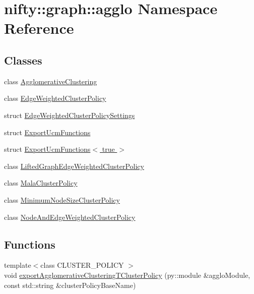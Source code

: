 \hypertarget{namespacenifty_1_1graph_1_1agglo}{}\section{nifty\+:\+:graph\+:\+:agglo Namespace Reference}
\label{namespacenifty_1_1graph_1_1agglo}
\subsection*{Classes}
\begin{DoxyCompactItemize}
\item 
class \hyperlink{classnifty_1_1graph_1_1agglo_1_1AgglomerativeClustering}{Agglomerative\+Clustering}
\item 
class \hyperlink{classnifty_1_1graph_1_1agglo_1_1EdgeWeightedClusterPolicy}{Edge\+Weighted\+Cluster\+Policy}
\item 
struct \hyperlink{structnifty_1_1graph_1_1agglo_1_1EdgeWeightedClusterPolicySettings}{Edge\+Weighted\+Cluster\+Policy\+Settings}
\item 
struct \hyperlink{structnifty_1_1graph_1_1agglo_1_1ExportUcmFunctions}{Export\+Ucm\+Functions}
\item 
struct \hyperlink{structnifty_1_1graph_1_1agglo_1_1ExportUcmFunctions_3_01true_01_4}{Export\+Ucm\+Functions$<$ true $>$}
\item 
class \hyperlink{classnifty_1_1graph_1_1agglo_1_1LiftedGraphEdgeWeightedClusterPolicy}{Lifted\+Graph\+Edge\+Weighted\+Cluster\+Policy}
\item 
class \hyperlink{classnifty_1_1graph_1_1agglo_1_1MalaClusterPolicy}{Mala\+Cluster\+Policy}
\item 
class \hyperlink{classnifty_1_1graph_1_1agglo_1_1MinimumNodeSizeClusterPolicy}{Minimum\+Node\+Size\+Cluster\+Policy}
\item 
class \hyperlink{classnifty_1_1graph_1_1agglo_1_1NodeAndEdgeWeightedClusterPolicy}{Node\+And\+Edge\+Weighted\+Cluster\+Policy}
\end{DoxyCompactItemize}
\subsection*{Functions}
\begin{DoxyCompactItemize}
\item 
{\footnotesize template$<$class C\+L\+U\+S\+T\+E\+R\+\_\+\+P\+O\+L\+I\+C\+Y $>$ }\\void \hyperlink{namespacenifty_1_1graph_1_1agglo_ac1f80b0263547645d7f6603e7a094bd1}{export\+Agglomerative\+Clustering\+T\+Cluster\+Policy} (py\+::module \&agglo\+Module, const std\+::string \&cluster\+Policy\+Base\+Name)
\end{DoxyCompactItemize}


